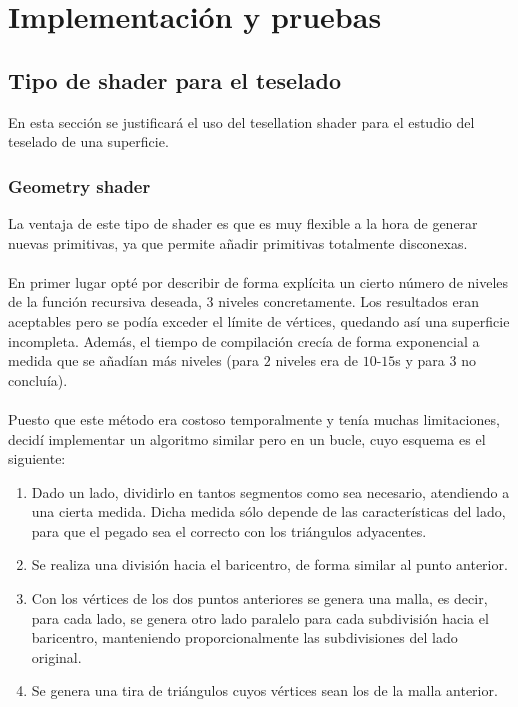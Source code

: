 
\chapter{Implementación y pruebas}

\section*{Tipo de shader para el teselado}
En esta sección se justificará el uso del tesellation shader para el estudio del teselado de una superficie.
 
\subsection*{Geometry shader}
	La ventaja de este tipo de shader es que es muy flexible a la hora de generar nuevas primitivas, ya que permite añadir primitivas totalmente disconexas.\\
	\\ En primer lugar opté por describir de forma explícita un cierto número de niveles de la función recursiva deseada, $3$ niveles concretamente. Los resultados eran aceptables pero se podía exceder el límite de vértices, quedando así una superficie incompleta. Además, el tiempo de compilación crecía de forma exponencial a medida que se añadían más niveles (para $2$ niveles era de $10$-$15$s y para $3$ no concluía).\\
	\\ Puesto que este método era costoso temporalmente y tenía muchas limitaciones, decidí implementar un algoritmo similar pero en un bucle, cuyo esquema es el siguiente:
	\begin{enumerate}
		\item Dado un lado, dividirlo en tantos segmentos como sea necesario, atendiendo a una cierta medida. Dicha medida sólo depende de las características del lado, para que el pegado sea el correcto con los triángulos adyacentes.
		\item Se realiza una división hacia el baricentro, de forma similar al punto anterior.
		\item Con los vértices de los dos puntos anteriores se genera una malla, es decir, para cada lado, se genera otro lado paralelo para cada subdivisión hacia el baricentro, manteniendo proporcionalmente las subdivisiones del lado original.
		\item Se genera una tira de triángulos cuyos vértices sean los de la malla anterior.
	\end{enumerate}
	
